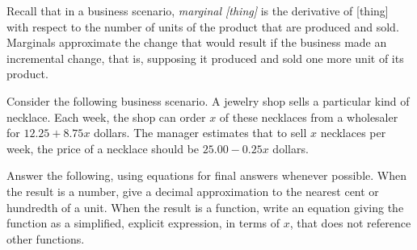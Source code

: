 
Recall that in a business scenario, \emph{marginal [thing]} is the derivative of [thing] with respect to the number of units of the product that are produced and sold.
Marginals approximate the change that would result if the business made an incremental change, that is, supposing it produced and sold one more unit of its product.




Consider the following business scenario.
A jewelry shop sells a particular kind of necklace.
Each week, the shop can order $x$ of these necklaces from a wholesaler for $12.25 + 8.75 x$ dollars.
The manager estimates that to sell $x$ necklaces per week, the price of a necklace should be $25.00 - 0.25 x$ dollars.

Answer the following, using equations for final answers whenever possible.
When the result is a number, give a decimal approximation to the nearest cent or hundredth of a unit.
When the result is a function, write an equation giving the function as a simplified, explicit expression, in terms of $x$, that does not reference other functions.

